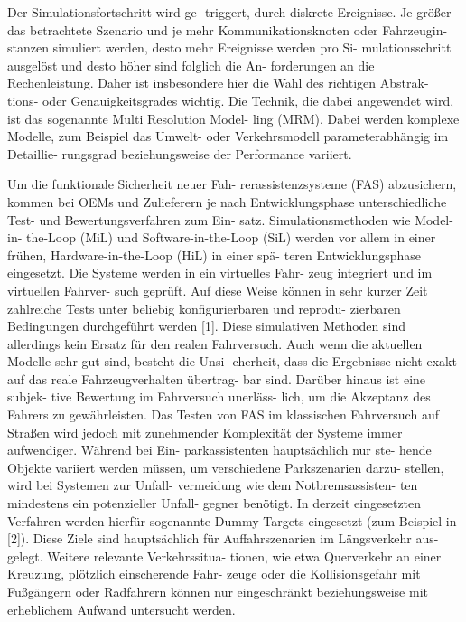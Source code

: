 Der Simulationsfortschritt wird ge- triggert, durch diskrete Ereignisse. Je größer das betrachtete Szenario und je mehr Kommunikationsknoten oder Fahrzeugin- stanzen simuliert werden, desto mehr Ereignisse werden pro Si- mulationsschritt ausgelöst und desto höher sind folglich die An- forderungen an die Rechenleistung. Daher ist insbesondere hier die Wahl des richtigen Abstrak- tions- oder Genauigkeitsgrades wichtig. Die Technik, die dabei angewendet wird, ist das sogenannte Multi Resolution Model- ling (MRM). Dabei werden komplexe Modelle, zum Beispiel das Umwelt- oder Verkehrsmodell parameterabhängig im Detaillie- rungsgrad beziehungsweise der Performance variiert. \cite{albers2010x}

Um die funktionale Sicherheit neuer Fah- rerassistenzsysteme (FAS) abzusichern, kommen bei OEMs und Zulieferern je nach Entwicklungsphase unterschiedliche Test- und Bewertungsverfahren zum Ein- satz. Simulationsmethoden wie Model-in- the-Loop (MiL) und Software-in-the-Loop (SiL) werden vor allem in einer frühen, Hardware-in-the-Loop (HiL) in einer spä- teren Entwicklungsphase eingesetzt. Die Systeme werden in ein virtuelles Fahr- zeug integriert und im virtuellen Fahrver- such geprüft. Auf diese Weise können in sehr kurzer Zeit zahlreiche Tests unter beliebig konfigurierbaren und reprodu- zierbaren Bedingungen durchgeführt werden [1]. Diese simulativen Methoden sind allerdings kein Ersatz für den realen Fahrversuch. Auch wenn die aktuellen Modelle sehr gut sind, besteht die Unsi- cherheit, dass die Ergebnisse nicht exakt auf das reale Fahrzeugverhalten übertrag- bar sind. Darüber hinaus ist eine subjek- tive Bewertung im Fahrversuch unerläss- lich, um die Akzeptanz des Fahrers zu gewährleisten. Das Testen von FAS im klassischen Fahrversuch auf Straßen wird jedoch mit zunehmender Komplexität der Systeme immer aufwendiger. Während bei Ein- parkassistenten hauptsächlich nur ste- hende Objekte variiert werden müssen, um verschiedene Parkszenarien darzu- stellen, wird bei Systemen zur Unfall- vermeidung wie dem Notbremsassisten- ten mindestens ein potenzieller Unfall- gegner benötigt. In derzeit eingesetzten Verfahren werden hierfür sogenannte Dummy-Targets eingesetzt (zum Beispiel in [2]). Diese Ziele sind hauptsächlich für Auffahrszenarien im Längsverkehr aus- gelegt. Weitere relevante Verkehrssitua- tionen, wie etwa Querverkehr an einer Kreuzung, plötzlich einscherende Fahr- zeuge oder die Kollisionsgefahr mit Fußgängern oder Radfahrern können nur eingeschränkt beziehungsweise mit erheblichem Aufwand untersucht werden. \cite{schwab2014durchgangige}


